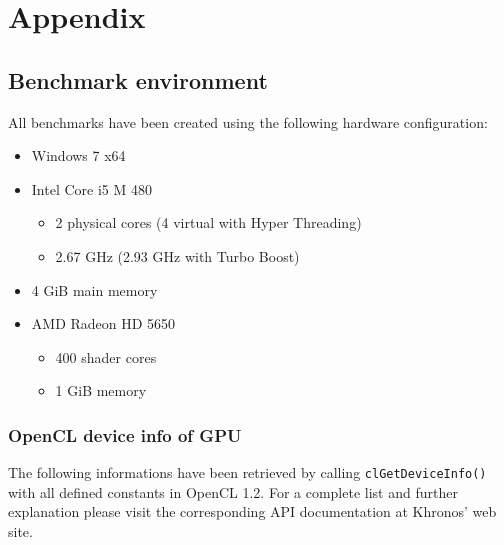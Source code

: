 \section{Appendix}

\subsection{Benchmark environment}

All benchmarks have been created using the following hardware configuration:

\begin{itemize}
	\item Windows 7 x64
	\item Intel Core i5 M 480
	\begin{itemize}
		\item 2 physical cores (4 virtual with Hyper Threading)
		\item 2.67 GHz (2.93 GHz with Turbo Boost)
	\end{itemize}
	\item 4 GiB main memory
	\item AMD Radeon HD 5650
	\begin{itemize}
		\item 400 shader cores
		\item 1 GiB memory
	\end{itemize}
\end{itemize}

\subsubsection{OpenCL device info of GPU}

The following informations have been retrieved by calling \lstinline!clGetDeviceInfo()! with all defined constants in OpenCL 1.2. For a complete list and further explanation please visit the corresponding API documentation at Khronos' web site.

